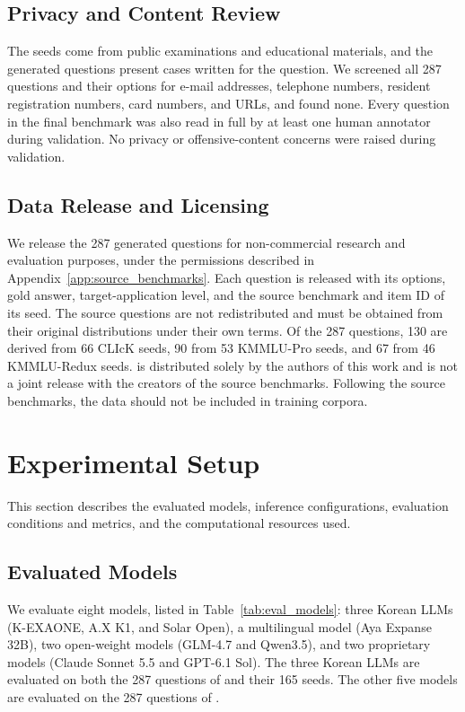 \subsection{Privacy and Content Review}

The seeds come from public examinations and educational materials, and the generated questions present cases written for the question.
We screened all 287 questions and their options for e-mail addresses, telephone numbers, resident registration numbers, card numbers, and URLs, and found none.
Every question in the final benchmark was also read in full by at least one human annotator during validation.
No privacy or offensive-content concerns were raised during validation.

\subsection{Data Release and Licensing}

We release the 287 generated questions for non-commercial research and evaluation purposes, under the permissions described in Appendix~\ref{app:source_benchmarks}.
Each question is released with its options, gold answer, target-application level, and the source benchmark and item ID of its seed.
The source questions are not redistributed and must be obtained from their original distributions under their own terms.
Of the 287 questions, 130 are derived from 66 CLIcK seeds, 90 from 53 KMMLU-Pro seeds, and 67 from 46 KMMLU-Redux seeds.
\name{} is distributed solely by the authors of this work and is not a joint release with the creators of the source benchmarks.
Following the source benchmarks, the data should not be included in training corpora.


\section{Experimental Setup}
\label{app:experimental_setup}

This section describes the evaluated models, inference configurations, evaluation conditions and metrics, and the computational resources used.

\subsection{Evaluated Models}

We evaluate eight models, listed in Table~\ref{tab:eval_models}: three Korean LLMs (K-EXAONE, A.X K1, and Solar Open), a multilingual model (Aya Expanse 32B), two open-weight models (GLM-4.7 and Qwen3.5), and two proprietary models (Claude Sonnet 5.5 and GPT-6.1 Sol).
The three Korean LLMs are evaluated on both the 287 questions of \name{} and their 165 seeds.
The other five models are evaluated on the 287 questions of \name{}.

